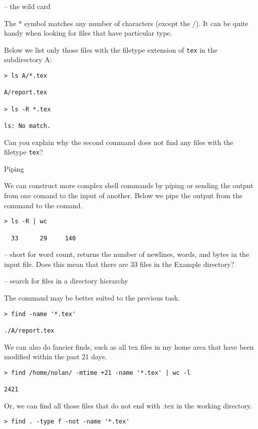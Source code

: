 {\shellArg{*} -- the wild card}

The * symbol matches any number of characters (except the /). It can be quite handy when looking for files that have particular type.

Below we list only those files with the filetype extension of \texttt{tex}
in the subdirectory A:
\begin{verbatim}
> ls A/*.tex

A/report.tex

> ls -R *.tex

ls: No match.
\end{verbatim}

Can you explain why the second command does not find any files with
the filetype \texttt{tex}?

{Piping \shellArg{$|$}}

We can construct more complex shell commands by piping or sending the output 
from one comand to the input of another.
Below we pipe the output from the  command to the 
 comand.

\begin{verbatim}
> ls -R | wc

  33      29     140
\end{verbatim}

 -- short for word count, returns the number of newlines, words, 
and bytes in the input file.
Does this mean that there are 33 files in the Example directory?

{ --  search for files in a directory hierarchy}

The  command may be better suited to the previous task.
\begin{verbatim}
> find -name '*.tex'

./A/report.tex
\end{verbatim}

We can also do fancier finds, such as all tex files 
in my home area that have been modified within the past 21 days.
\begin{verbatim}
> find /home/nolan/ -mtime +21 -name '*.tex' | wc -l

2421
\end{verbatim}

Or, we can find all those files that do not end with .tex
in the working directory.
\begin{verbatim}
> find . -type f -not -name '*.tex'
\end{verbatim}


